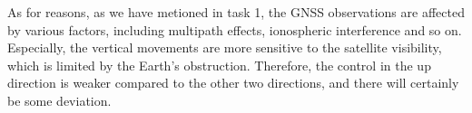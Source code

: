 \documentclass{article}
\begin{document}
As for reasons, as we have metioned in task 1, the GNSS observations are affected by various factors,
including multipath effects, ionospheric interference and so on.
Especially, the vertical movements are more sensitive to the satellite visibility,
which is limited by the Earth's obstruction. 
Therefore, the control in the up direction is weaker compared to the other two directions, 
and there will certainly be some deviation.
\end{document}
